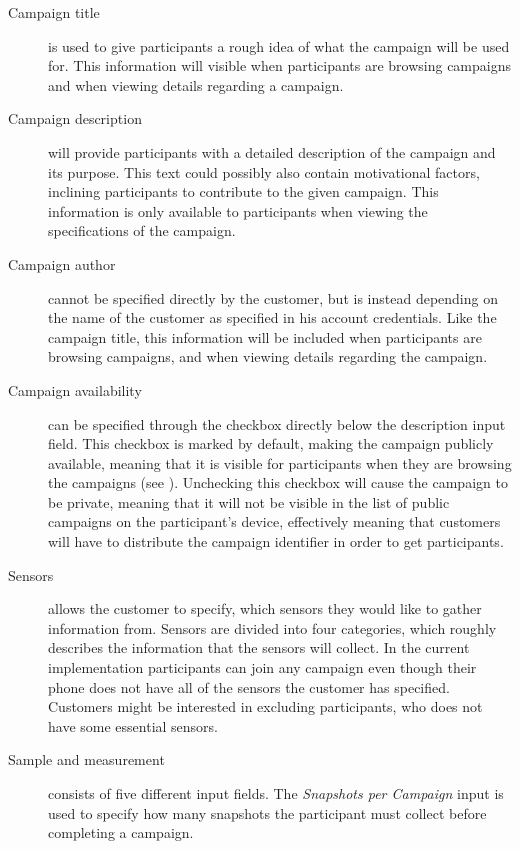 \begin{description}
    \item[Campaign title] is used to give participants a rough idea of what the campaign will be used for. This information will visible when participants are browsing campaigns and when viewing details regarding a campaign.
\end{description}
\newpage
\begin{description}
    \item[Campaign description] will provide participants with a detailed description of the campaign and its purpose. This text could possibly also contain motivational factors, inclining participants to contribute to the given campaign. This information is only available to participants when viewing the specifications of the campaign.

    \item[Campaign author] cannot be specified directly by the customer, but is instead depending on the name of the customer as specified in his account credentials. Like the campaign title, this information will be included when participants are browsing campaigns, and when viewing details regarding the campaign.

    \item[Campaign availability] can be specified through the checkbox directly below the description input field. This checkbox is marked by default, making the campaign publicly available, meaning that it is visible for participants when they are browsing the campaigns (see ). Unchecking this checkbox will cause the campaign to be private, 
    meaning that it will not be visible in the list of public campaigns on the participant's device, effectively meaning that customers will have to distribute the campaign identifier in order to get participants.

    \item[Sensors] allows the customer to specify, which sensors they would like to gather information from. Sensors are divided into four categories, which roughly describes the information that the sensors will collect. In the current implementation participants can join any campaign even though their phone does not have all of the sensors the customer has specified. Customers might be interested in excluding participants, who does not have some essential sensors.

    \item[Sample and measurement] consists of five different input fields. The \emph{Snapshots per Campaign} input is used to specify how many snapshots the participant must collect before completing a campaign.


\end{description}
